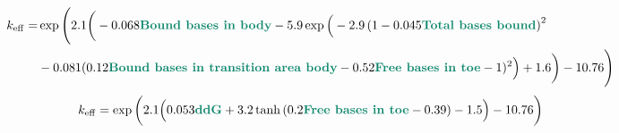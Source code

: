 \documentclass[a4paper,landscape]{article}
\begin{document}
\begin{align*}
k_\mathrm{eff}=&\exp\Bigg(2.1\bigg( - 0.068 \text{\textbf{\textcolor{PineGreen}{Bound bases in body}}} - 5.9 \exp\Big(
- 2.9 \left(1 - 0.045 \text{\textbf{\textcolor{PineGreen}{Total bases bound}}}\right)^{2}\\
&-0.081 (0.12 \text{\textbf{\textcolor{PineGreen}{Bound bases in transition area body}}} 
- 0.52  \text{\textbf{\textcolor{PineGreen}{Free bases in toe}}} - 1)^{2}\Big) + 1.6\bigg)-10.76\Bigg) 
\end{align*}
\begin{align*}
k_\mathrm{eff}=\exp\bigg(2.1\Big(0.053 \text{\textbf{\textcolor{PineGreen}{ddG}}} + 3.2 \tanh{\left(0.2 \text{\textbf{\textcolor{PineGreen}{Free bases in toe}}} - 0.39 \right)} - 1.5\Big)-10.76\bigg) 
\end{align*}
\end{document}
